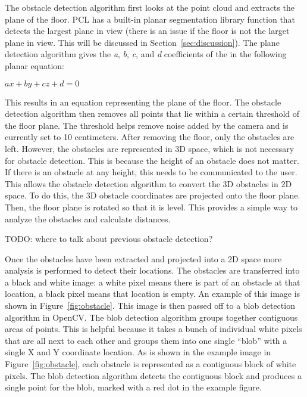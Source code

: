 The obstacle detection algorithm first looks at the point cloud and extracts the
plane of the floor. PCL has a built-in planar segmentation library function that
detects the largest plane in view (there is an issue if the floor is not the
larget plane in view. This will be discussed in Section~\ref{sec:discussion}).
The plane detection algorithm gives the \emph{a}, \emph{b}, \emph{c}, and
\emph{d} coefficients of the in the following planar equation:

\begin{math}
ax + by + cz + d = 0
\end{math}

This results in an equation representing the plane of the floor. The obstacle
detection algorithm then removes all points that lie within a certain threshold
of the floor plane. The threshold helps remove noise added by the camera and is
currently set to 10 centimeters. After removing the floor, only the obstacles
are left. However, the obstacles are represented in 3D space, which is not
necessary for obstacle detection. This is because the height of an obstacle does
not matter. If there is an obstacle at any height, this needs to be
communicated to the user. This allows the obstacle detection algorithm to
convert the 3D obstacles in 2D space. To do this, the 3D obstacle coordinates
are projected onto the floor plane. Then, the floor plane is rotated so that it
is level. This provides a simple way to analyze the obstacles and calculate
distances.

TODO: where to talk about previous obstacle detection?

Once the obstacles have been extracted and projected into a 2D space more
analysis is performed to detect their locations. The obstacles are transferred
into a black and white image: a white pixel means there is part of an obstacle
at that location, a black pixel means that location is empty. An example of this
image is shown in Figure~\ref{fig:obstacle}. This image is then
passed off to a blob detection algorithm in OpenCV\cite{opencv-website}. The
blob detection algorithm groups together contiguous areas of points. This is
helpful because it takes a bunch of individual white pixels that are all next to
each other and groups them into one single ``blob'' with a single X and Y
coordinate location. As is shown in the example image in
Figure~\ref{fig:obstacle}, each obstacle is represented as a contiguous block
of white pixels. The blob detection algorithm detects the contiguous block and
produces a single point for the blob, marked with a red dot in the example
figure.

